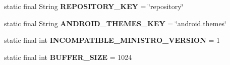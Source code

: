 \begin{DoxyCompactItemize}
static final String {\bfseries R\+E\+P\+O\+S\+I\+T\+O\+R\+Y\+\_\+\+K\+EY} = \char`\"{}repository\char`\"{}
\item 
\mbox{\label{classorg_1_1qtproject_1_1qt5_1_1android_1_1bindings_1_1_qt_loader_aa4024216bb3b0263484216604515b563}} 
static final String {\bfseries A\+N\+D\+R\+O\+I\+D\+\_\+\+T\+H\+E\+M\+E\+S\+\_\+\+K\+EY} = \char`\"{}android.\+themes\char`\"{}
\item 
\mbox{\label{classorg_1_1qtproject_1_1qt5_1_1android_1_1bindings_1_1_qt_loader_a0a74b4ce377c50e50d9201bb8e03b32c}} 
static final int {\bfseries I\+N\+C\+O\+M\+P\+A\+T\+I\+B\+L\+E\+\_\+\+M\+I\+N\+I\+S\+T\+R\+O\+\_\+\+V\+E\+R\+S\+I\+ON} = 1
\item 
\mbox{\label{classorg_1_1qtproject_1_1qt5_1_1android_1_1bindings_1_1_qt_loader_a20513d3b471c5550c5d7e93abb2b045e}} 
static final int {\bfseries B\+U\+F\+F\+E\+R\+\_\+\+S\+I\+ZE} = 1024
\end{DoxyCompactItemize}
